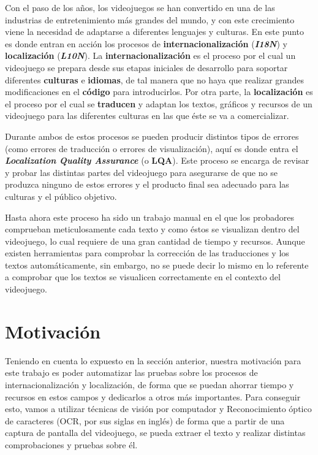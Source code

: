 

Con el paso de los años, los videojuegos se han convertido en una de las industrias de entretenimiento más grandes del mundo, y con este crecimiento viene la necesidad de adaptarse a diferentes lenguajes y culturas.
En este punto es donde entran en acción los procesos de \textbf{internacionalización} (\textbf{\textit{I18N}}) y \textbf{localización} (\textbf{\textit{L10N}}).
La \textbf{internacionalización} es el proceso por el cual un videojuego se prepara desde sus etapas iniciales de desarrollo para soportar diferentes \textbf{culturas} e \textbf{idiomas}, de tal manera que no haya que realizar grandes modificaciones en el \textbf{código} para introducirlos.
Por otra parte, la \textbf{localización} es el proceso por el cual se \textbf{traducen} y adaptan los textos, gráficos y recursos de un videojuego para las diferentes culturas en las que éste se va a comercializar.

Durante ambos de estos procesos se pueden producir distintos tipos de errores (como errores de traducción o errores de visualización), aquí es donde entra el \textbf{\textit{Localization Quality Assurance}} (o \textbf{LQA}). Este proceso se encarga de revisar y probar las distintas partes del videojuego para asegurarse de que no se produzca ninguno de estos errores y el producto final sea adecuado para las culturas y el público objetivo.

Hasta ahora este proceso ha sido un trabajo manual en el que los probadores comprueban meticulosamente cada texto y como éstos se visualizan dentro del videojuego, lo cual requiere de una gran cantidad de tiempo y recursos. Aunque existen herramientas para comprobar la corrección de las traducciones y los textos automáticamente, sin embargo, no se puede decir lo mismo en lo referente a comprobar que los textos se visualicen correctamente en el contexto del videojuego.

\section{Motivación}
Teniendo en cuenta lo expuesto en la sección anterior, nuestra motivación para este trabajo es poder automatizar las pruebas sobre los procesos de internacionalización y localización, de forma que se puedan
ahorrar tiempo y recursos en estos campos y dedicarlos a otros más importantes. Para conseguir esto, vamos a utilizar técnicas de visión por computador y Reconocimiento óptico de caracteres (OCR, por sus siglas en inglés)
de forma que a partir de una captura de pantalla del videojuego, se pueda extraer el texto y realizar distintas comprobaciones y pruebas sobre él.


